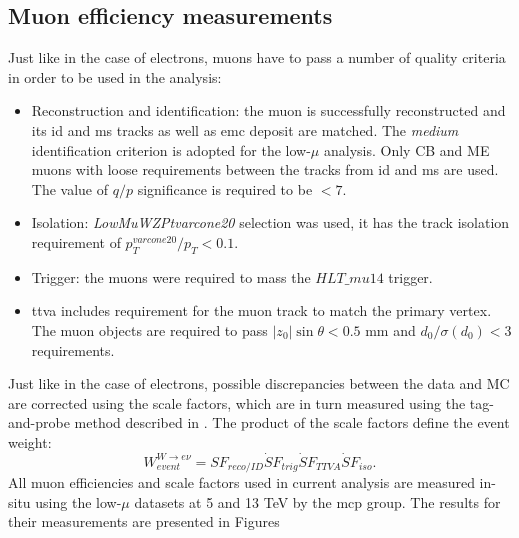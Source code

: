     \subsection{Muon efficiency measurements}
    Just like in the case of electrons, muons have to pass a number of quality criteria in order to be used in the analysis:
    \begin{itemize}
    	\item Reconstruction and identification: the muon is successfully reconstructed and its \gls{id} and \gls{ms} tracks as well as \gls{emc} deposit are matched. The \textit{medium} identification criterion is adopted for the low-$\mu$ analysis. Only CB and ME muons with loose requirements between the tracks from \gls{id} and \gls{ms} are used. The value of $q/p$ significance is required to be $<7$. 
    	\item Isolation: \textit{LowMuWZPtvarcone20} selection was used, it has the track isolation requirement of $p_T^{varcone20}/p_T<0.1$. 
    	\item Trigger: the muons were required to mass the $HLT\_mu14$ trigger.
    	\item \gls{ttva} includes requirement for the muon track to match the primary vertex. The muon objects are required to pass $|z_0|\sin{\theta}<0.5$ mm and $d_0/\sigma(d_0)<3$ requirements.
    \end{itemize}
	Just like in the case of electrons, possible discrepancies between the data and MC are corrected using the scale factors, which are in turn measured using the tag-and-probe method described in \cite{Koehler:2665704}. The product of the scale factors define the event weight: 
	\begin{equation*}
	W_{event}^{W\rightarrow e\nu}=SF_{reco/ID} \dot SF_{trig} \dot SF_{TTVA} \dot SF_{iso}.
	\end{equation*}
	All muon efficiencies and scale factors used in current analysis are measured in-situ using the low-$\mu$ datasets at 5 and 13 TeV by the \gls{mcp} group. The results for their measurements are presented in Figures 
	
